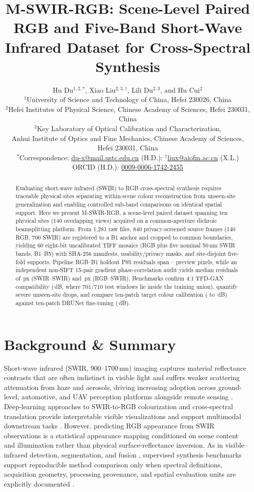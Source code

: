 \documentclass[a4paper,10pt]{article}
\title{\textbf{M-SWIR-RGB: Scene-Level Paired RGB and Five-Band Short-Wave Infrared Dataset for Cross-Spectral Synthesis}}
\author{Hu Du$^{1,2,*}$, Xiao Liu$^{2,3,\dagger}$, Lili Du$^{2,3}$, and Hu Cui$^{2}$\\[0.35em]
\small $^{1}$University of Science and Technology of China, Hefei 230026, China\\
\small $^{2}$Hefei Institutes of Physical Science, Chinese Academy of Sciences, Hefei 230031, China\\
\small $^{3}$Key Laboratory of Optical Calibration and Characterization,\\
\small Anhui Institute of Optics and Fine Mechanics, Chinese Academy of Sciences, Hefei 230031, China\\[0.25em]
\small $^{*}$Correspondence: \href{mailto:du-x@mail.ustc.edu.cn}{du-x@mail.ustc.edu.cn} (H.D.); $^{\dagger}$\href{mailto:liux@aiofm.ac.cn}{liux@aiofm.ac.cn} (X.L.)\\
\small ORCID (H.D.): \href{https://orcid.org/0009-0006-1742-2455}{0009-0006-1742-2455}}
\date{}
\begin{document}
\maketitle
\begin{abstract}
Evaluating short-wave infrared (SWIR) to RGB cross-spectral synthesis requires traceable physical sites separating within-scene colour reconstruction from unseen-site generalization and enabling controlled sub-band comparisons on identical spatial support. Here we present M-SWIR-RGB, a scene-level paired dataset spanning ten physical sites (140 overlapping views) acquired on a common-aperture dichroic beamsplitting platform. From 1,281 raw files, 840 privacy-screened source frames (140 RGB, 700 SWIR) are registered to a B1 anchor and cropped to common boundaries, yielding 60 eight-bit uncalibrated TIFF mosaics (RGB plus five nominal 50\,nm SWIR bands, B1--B5) with SHA-256 manifests, usability/privacy masks, and site-disjoint five-fold supports. Pipeline RGB--B1 holdout P95 residuals span \GeomRgbBOnePrevMin--\GeomRgbBOnePrevMax{} preview pixels, while an independent non-SIFT 15-pair gradient phase-correlation audit yields median residuals of \AuditSwirSwirMed\,px (SWIR--SWIR) and \AuditRgbSwirMed\,px (RGB--SWIR). Benchmarks confirm 4:1 TFD-GAN compatibility (\MsEpTwoHundredPsnrPm\,dB, where 701/710 test windows lie inside the training union), quantify severe unseen-site drops, and compare ten-patch target colour calibration (\CalibrationCross{} to \CalibrationTarget\,dB) against ten-patch DRUNet fine-tuning (\TrackCDrFtPsnr\,dB).
\end{abstract}

\section{Background \& Summary}
Short-wave infrared (SWIR, 900--1700\,nm) imaging captures material reflectance contrasts that are often indistinct in visible light and suffers weaker scattering attenuation from haze and aerosols, driving increasing adoption across ground-level, automotive, and UAV perception platforms alongside remote sensing \cite{narasimhan2002,rogalski2003,bijelic2020fog,song2024,sivaprakasam2023,bessonov2025,duan2025}. Deep-learning approaches to SWIR-to-RGB colourization and cross-spectral translation provide interpretable visible visualizations and support multimodal downstream tasks \cite{levin2004colorization,zhang2016colorful,borstelmann2024,chen2025,chen2026threeband}. However, predicting RGB appearance from SWIR observations is a statistical appearance mapping conditioned on scene content and illumination rather than physical surface-reflectance inversion. As in visible--infrared detection, segmentation, and fusion \cite{ha2017,hwang2015,jia2021,liu2023segmif}, supervised synthesis benchmarks support reproducible method comparison only when spectral definitions, acquisition geometry, processing provenance, and spatial evaluation units are explicitly documented \cite{gebru2021,wilkinson2016}.
\end{document}

